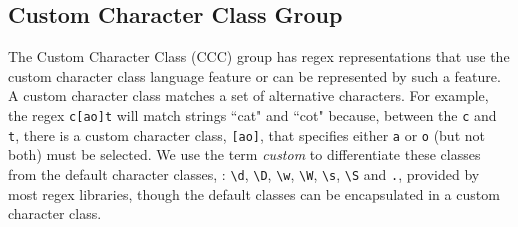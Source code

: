 \subsection{Custom Character Class Group}
The Custom Character Class (CCC) group has regex representations that use the custom character class language feature or can be represented by such a feature.
 A custom character class matches a set of alternative characters.  For example, the regex \verb!c[ao]t! will match strings ``cat" and ``cot" because, between the \verb!c! and \verb!t!, there is a custom character class, \verb![ao]!, that specifies either \verb!a! or \verb!o! (but not both) must be selected.  We use the term \emph{custom} to differentiate these classes  from the default character classes, : \verb!\d!, \verb!\D!, \verb!\w!, \verb!\W!, \verb!\s!, \verb!\S! and \verb!.!,  provided by most regex libraries, though the default classes can be encapsulated in a custom character class. %
